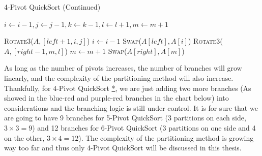 \documentclass{article}
\begin{document}
\clearpage

\begin{algorithm}[H]
    \caption{4-Pivot QuickSort (Continued)}\label{4PivotQuickSort2}
    \begin{algorithmic}[1]
        \EndWhile
        \State $i \gets i - 1, j \gets j - 1, k \gets k - 1, l \gets l + 1, m \gets m + 1$
        
        \State \textsc{Rotate3}($A, [left + 1, i, j]$)
        \State $i \gets i - 1$
        \State \textsc{Swap}($A[left], A[i]$)
        \State \textsc{Rotate3}($A, [right - 1, m, l]$)
        \State $m \gets m + 1$
        \State \textsc{Swap}($A[right], A[m]$)
        \EndProcedure
    \end{algorithmic}
\end{algorithm}

As long as the number of pivots increases, the number of branches will grow linearly, and the complexity of the partitioning method will also increase.
Thankfully, for 4-Pivot QuickSort \hyperlink{fig:4pivot}{*}, we are just adding two more branches (As showed in the blue-red and purple-red branches in the chart below)
into considerations and the branching logic is still under control.
It is for sure that we are going to have 9 branches for 5-Pivot QuickSort (3 partitions on each side, $3 \times 3 = 9$) and 12 branches for 6-Pivot QuickSort (3 partitions on one side and 4 on the other, $3 \times 4 = 12$).
The complexity of the partitioning method is growing way too far and thus only 4-Pivot QuickSort will be discussed in this thesis.
\end{document}
